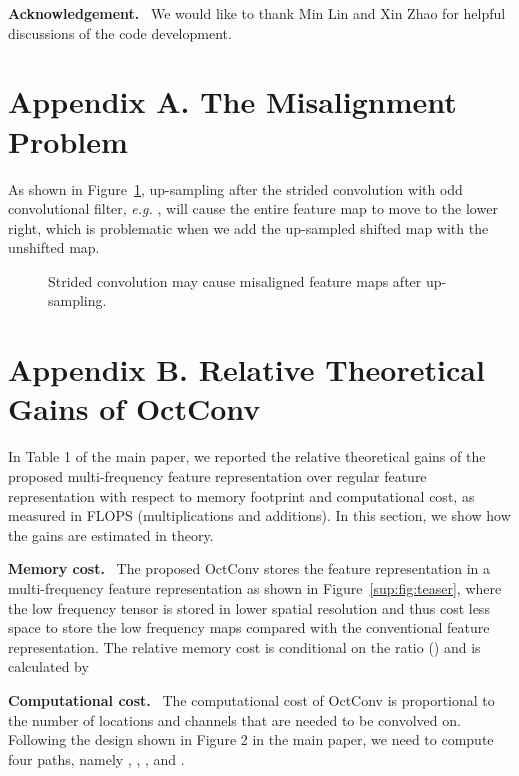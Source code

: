 \documentclass[10pt,twocolumn,letterpaper]{article}
\newcommand{\hiConv}[0]{OctConv\xspace}
\newcommand{\myparagraph}[1]{\vspace{1pt}\noindent\textbf{#1.}~}
\begin{document}
\myparagraph{Acknowledgement}
We would like to thank Min Lin and Xin Zhao for helpful discussions of the code development. 


{\small


}

\newpage
\setcounter{section}{0}
\setcounter{subsection}{0}


\section*{Appendix A. The Misalignment Problem}

As shown in Figure~\ref{fig:center-shitted}, up-sampling after the strided convolution with odd convolutional filter, \emph{e.g.} , will cause the entire feature map to move to the lower right, which is problematic when we add the up-sampled shifted map with the unshifted map.

\begin{figure}[h]
\centering
{}
\caption{Strided convolution may cause misaligned feature maps after up-sampling.}
\label{fig:center-shitted}
\end{figure}
 


\section*{Appendix B. Relative Theoretical Gains of \hiConv}
In Table 1 of the main paper, we reported the relative theoretical gains of the proposed multi-frequency feature representation over regular feature representation with respect to memory footprint and computational cost, as measured in FLOPS (\ie multiplications and additions). In this section, we show how the gains are estimated in theory.


\myparagraph{Memory cost}
The proposed \hiConv stores the feature representation in a multi-frequency feature representation as shown in Figure~\ref{sup:fig:teaser}, where the low frequency tensor is stored in  lower spatial resolution and thus cost  less space to store the low frequency maps compared with the conventional feature representation. The relative memory cost is conditional on the ratio () and is calculated by


\myparagraph{Computational cost}
The computational cost of \hiConv is proportional to the number of locations and channels that are needed to be convolved on. Following the design shown in Figure 2 in the main paper, we need to compute four paths, namely , , , and .
\end{document}
